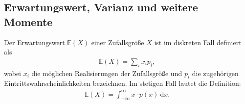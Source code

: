 \documentclass[10pt, a4paper, twoside]{extarticle}
\theoremstyle{nonumberplain}
\theoremstyle{plain}
\newcounter{defi}[part]\setcounter{defi}{0}
\begin{document}
\subsection{Erwartungswert, Varianz und weitere Momente}

Der Erwartungswert $ \mathbb{E}(X) $ einer Zufallsgröße $ X $ ist im diskreten Fall definiert als \begin{align*}
\mathbb{E}(X)=\sum_ix_ip_i,
\end{align*}
wobei $ x_i $ die möglichen Realisierungen der Zufallsgröße und $ p_i $ die zugehörigen Eintrittswahrscheinlichkeiten bezeichnen. Im stetigen Fall lautet die Definition: \begin{align*}
\mathbb{E}(X)=\int_{-\infty}^\infty x\cdot p(x)\ \mathrm{d}x.
\end{align*}
\end{document}

